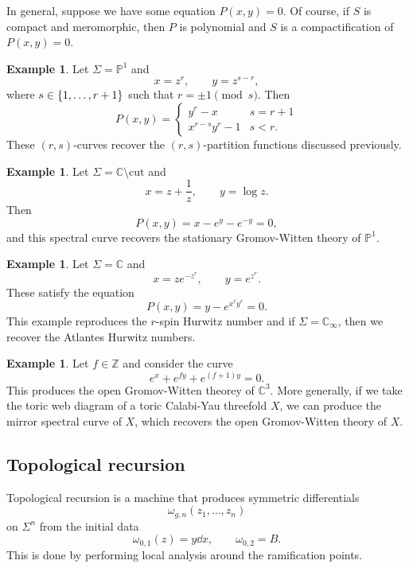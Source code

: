 \documentclass{amsart}
\theoremstyle{definition}
\newtheorem{exm}[thm]{Example}
\theoremstyle{remark}
\theoremstyle{plain}
\theoremstyle{definition}
\theoremstyle{remark}
\newcommand{\C}{\mathbb{C}}
\newcommand{\Z}{\mathbb{Z}}
\renewcommand{\P}{\mathbb{P}}
\newcommand{\mr}[1]{\mathrm{#1}}
\newcommand{\1}{\mathbf{1}}
\newcommand{\2}{\mathbf{2}}
\newcommand{\3}{\mathbf{3}}
\begin{document}
In general, suppose we have some equation $P(x,y) = 0$. Of course, if $S$ is compact and meromorphic, then $P$ is polynomial and $S$ is a compactification of $P(x,y) = 0$.

\begin{exm}
    Let $\Sigma = \P^1$ and 
    \[ x = z^r, \qquad y = z^{s-r}, \]
    where $s \in \qty{1, \ldots, r+1}$ such that $r = \pm 1 \pmod s$. Then
    \[ P(x,y) = \begin{cases}
        y^r-x & s = r+1 \\
        x^{r-s}y^r - 1 & s < r.
    \end{cases}
    \]
    These $(r,s)$-curves recover the $(r,s)$-partition functions discussed previously.
\end{exm}

\begin{exm}
    Let $\Sigma = \C \setminus \mr{cut}$ and
    \[ x = z + \frac{1}{z}, \qquad y = \log z. \]
    Then 
    \[ P(x,y) = x - e^y - e^{-y} = 0, \]
    and this spectral curve recovers the stationary Gromov-Witten theory of $\P^1$.
\end{exm}

\begin{exm}
    Let $\Sigma = \C$ and
    \[ x = ze^{-z^r}, \qquad y = e^{z^r}. \]
    These satisfy the equation
    \[ P(x,y) = y-e^{x^r y^r} = 0. \]
    This example reproduces the $r$-spin Hurwitz number and if $\Sigma = \C_{\infty}$, then we recover the Atlantes Hurwitz numbers.
\end{exm}

\begin{exm}
    Let $f \in \Z$ and consider the curve
    \[ e^x + e^{fy} + e^{(f+1)y} = 0. \]
    This produces the open Gromov-Witten theorey of $\C^3$. More generally, if we take the toric web diagram of a toric Calabi-Yau threefold $X$, we can produce the mirror spectral curve of $X$, which recovers the open Gromov-Witten theory of $X$.
\end{exm}

\subsection{Topological recursion}

Topological recursion is a machine that produces symmetric differentials
\[ \omega_{g,n}(z_1, \ldots, z_n) \]
on $\Sigma^n$ from the initial data
\[ \omega_{0,1}(z) = y \dd{x}, \qquad \omega_{0,2} = B. \]
This is done by performing local analysis around the ramification points.
\end{document}
